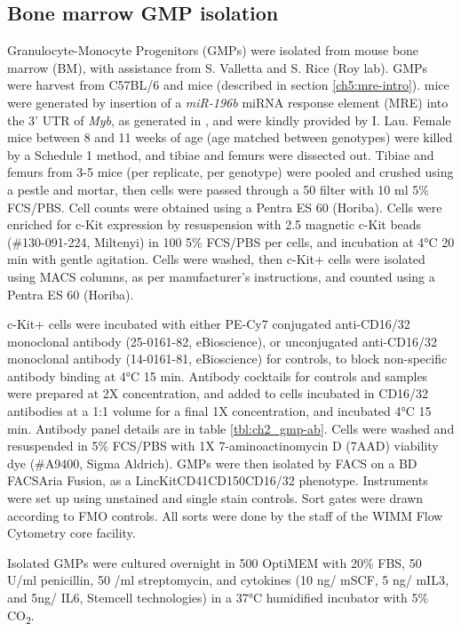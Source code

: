 \subsection{\label{ch2:gmp-isolation}Bone marrow GMP isolation}
Granulocyte-Monocyte Progenitors (GMPs) were isolated from mouse bone marrow (BM), with assistance from S. Valletta and S. Rice (Roy lab). GMPs were harvest from C57BL/6 \mybwt{} and \mybmre{} mice (described in section \ref{ch5:mre-intro}). \mybmre{} mice were generated by insertion of a \textit{miR-196b} miRNA response element (MRE) into the 3' UTR of \textit{Myb}, as generated in \citep{lau_role_2022}, and were kindly provided by I. Lau. Female mice between 8 and 11 weeks of age (age matched between genotypes) were killed by a Schedule 1 method, and tibiae and femurs were dissected out. Tibiae and femurs from 3-5 mice (per replicate, per genotype) were pooled and crushed using a pestle and mortar, then cells were passed through a 50 \microm{} filter with 10 ml 5\% FCS/PBS. Cell counts were obtained using a Pentra ES 60 (Horiba). Cells were enriched for c-Kit expression by resuspension with 2.5 \microl{} magnetic c-Kit beads (\#130-091-224, Miltenyi) in 100 \microl{} 5\% FCS/PBS per  cells, and incubation at 4°C 20 min with gentle agitation. Cells were washed, then c-Kit+ cells were isolated using MACS columns, as per manufacturer's instructions, and counted using a Pentra ES 60 (Horiba). 

c-Kit+ cells were incubated with either PE-Cy7 conjugated anti-CD16/32 monoclonal antibody (25-0161-82, eBioscience), or unconjugated anti-CD16/32 monoclonal antibody (14-0161-81, eBioscience) for controls, to block non-specific antibody binding at 4°C 15 min. Antibody cocktails for controls and samples were prepared at 2X concentration, and added to cells incubated in CD16/32 antibodies at a 1:1 volume for a final 1X concentration, and incubated 4°C 15 min. Antibody panel details are in table \ref{tbl:ch2_gmp-ab}. Cells were washed and resuspended in 5\% FCS/PBS with 1X 7-aminoactinomycin D (7AAD) viability dye (\#A9400, Sigma Aldrich). GMPs were then isolated by FACS on a BD FACSAria Fusion, as a Lin\uneg{}cKit\upos{}CD41\uneg{}CD150\uneg{}CD16/32\upos{} phenotype. Instruments were set up using unstained and single stain controls. Sort gates were drawn according to FMO controls. All sorts were done by the staff of the WIMM Flow Cytometry core facility. 

Isolated GMPs were cultured overnight in 500 \microl{} OptiMEM with 20\% FBS, 50 U/ml penicillin, 50 \microg/ml streptomycin, and cytokines (10 ng/\microl{} mSCF, 5 ng/\microl{} mIL3, and 5ng/\microl{} IL6, Stemcell technologies) in a 37°C humidified incubator with 5\% CO\textsubscript{2}. 

